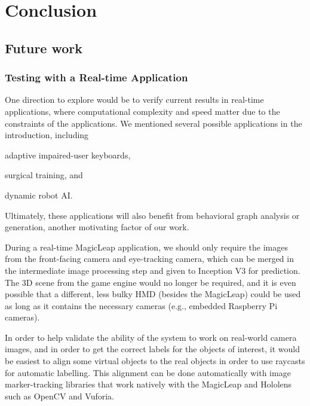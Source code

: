 \section{Conclusion}


\subsection{Future work}

\subsubsection{Testing with a Real-time Application}

One direction to explore would be to verify current results in real-time
applications, where computational complexity and speed matter due to the
constraints of the applications. We mentioned several possible applications in
the introduction, including
\begin{inlist}
\item adaptive impaired-user keyboards,
\item surgical training, and
\item dynamic robot AI\@.
\end{inlist}
Ultimately, these applications will also benefit from behavioral graph analysis
or generation, another motivating factor of our work.

During a real-time MagicLeap application, we should only require the images from
the front-facing camera and eye-tracking camera, which can be merged in the
intermediate image processing step and given to Inception V3 for prediction. The
3D scene from the game engine would no longer be required, and it is even
possible that a different, less bulky HMD (besides the MagicLeap) could be used
as long as it contains the necessary cameras (e.g., embedded Raspberry Pi
cameras).

In order to help validate the ability of the system to work on real-world camera
images, and in order to get the correct labels for the objects of interest, it
would be easiest to align some virtual objects to the real objects in order to
use raycasts for automatic labelling. This alignment can be done automatically
with image marker-tracking libraries that work natively with the MagicLeap and
Hololens such as OpenCV and Vuforia.
